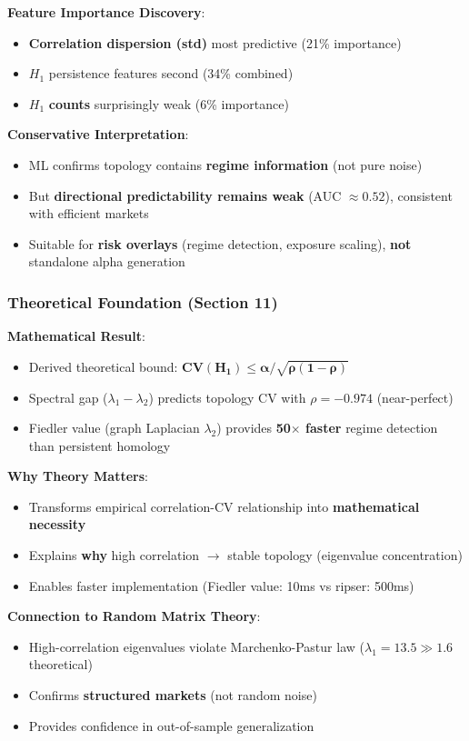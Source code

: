 \textbf{Feature Importance Discovery}:
\begin{itemize}
\item \textbf{Correlation dispersion (std)} most predictive (21\% importance)
\item $H_1$ persistence features second (34\% combined)
\item $H_1$ \textbf{counts} surprisingly weak (6\% importance)
\end{itemize}

\textbf{Conservative Interpretation}:
\begin{itemize}
\item ML confirms topology contains \textbf{regime information} (not pure noise)
\item But \textbf{directional predictability remains weak} (AUC $\approx 0.52$), consistent with efficient markets
\item Suitable for \textbf{risk overlays} (regime detection, exposure scaling), \textbf{not} standalone alpha generation
\end{itemize}

\subsubsection{Theoretical Foundation (Section 11)}

\textbf{Mathematical Result}:
\begin{itemize}
\item Derived theoretical bound: $\mathbf{\text{CV}(H_1) \leq \alpha / \sqrt{\rho(1-\rho)}}$
\item Spectral gap ($\lambda_1 - \lambda_2$) predicts topology CV with $\rho = -0.974$ (near-perfect)
\item Fiedler value (graph Laplacian $\lambda_2$) provides \textbf{50$\times$ faster} regime detection than persistent homology
\end{itemize}

\textbf{Why Theory Matters}:
\begin{itemize}
\item Transforms empirical correlation-CV relationship into \textbf{mathematical necessity}
\item Explains \textbf{why} high correlation $\rightarrow$ stable topology (eigenvalue concentration)
\item Enables faster implementation (Fiedler value: 10ms vs ripser: 500ms)
\end{itemize}

\textbf{Connection to Random Matrix Theory}:
\begin{itemize}
\item High-correlation eigenvalues violate Marchenko-Pastur law ($\lambda_1 = 13.5 \gg 1.6$ theoretical)
\item Confirms \textbf{structured markets} (not random noise)
\item Provides confidence in out-of-sample generalization
\end{itemize}

